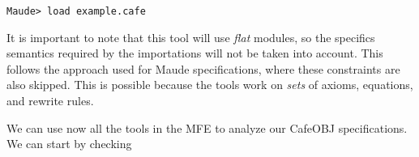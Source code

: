 {\codesize
\begin{verbatim}
Maude> load example.cafe
\end{verbatim}
}

It is important to note that this tool will use \emph{flat} modules, so the specifics
semantics required by the importations will not be taken into account.
This follows the approach used for Maude specifications, where these constraints are also
skipped. This is possible because the tools work on \emph{sets} of axioms, equations, and
rewrite rules.

We can use now all the tools in the MFE to analyze our CafeOBJ specifications.
We can start by checking
















